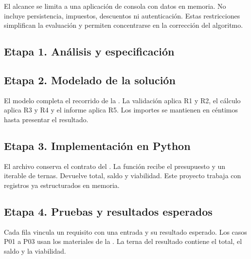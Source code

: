 El alcance se limita a una aplicación de consola con datos en memoria. No incluye persistencia, impuestos, descuentos ni autenticación. Estas restricciones simplifican la evaluación y permiten concentrarse en la corrección del algoritmo.

\subsection{Etapa 1. Análisis y especificación}



\subsection{Etapa 2. Modelado de la solución}


El modelo completa el recorrido de la . La validación aplica R1 y R2, el cálculo aplica R3 y R4 y el informe aplica R5. Los importes se mantienen en céntimos hasta presentar el resultado.

\subsection{Etapa 3. Implementación en Python}


El archivo  conserva el contrato del . La función recibe el presupuesto y un iterable de ternas. Devuelve total, saldo y viabilidad. Este proyecto trabaja con registros ya estructurados en memoria.

\subsection{Etapa 4. Pruebas y resultados esperados}

Cada fila vincula un requisito con una entrada y su resultado esperado. Los casos P01 a P03 usan los materiales de la . La terna del resultado contiene el total, el saldo y la viabilidad.




